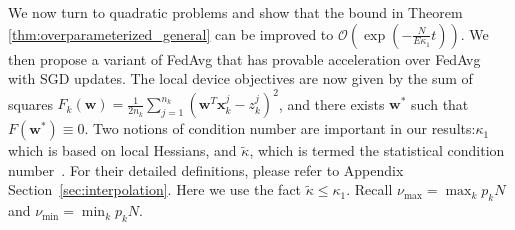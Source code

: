 We now turn to quadratic problems and show that the bound in Theorem \ref{thm:overparameterized_general} can be improved to $\mathcal{O}(\exp(-\frac{N}{E\kappa_{1}}t))$. We then propose a variant of FedAvg that has provable acceleration over FedAvg with SGD updates. The local device objectives are now given by the sum of squares {\small$F_{k}(\mathbf{w})=\frac{1}{2n_{k}}\sum_{j=1}^{n_{k}}(\mathbf{w}^{T}\mathbf{x}_{k}^{j}-z_{k}^{j})^{2}$},
and there exists $\mathbf{w}^{\ast}$ such that $F(\mathbf{w}^{\ast})\equiv0$. Two notions of condition number are important in our results:$\kappa_1$ which is based on local Hessians, and $\tilde{\kappa}$, which is termed the statistical condition number~\cite{liu2018accelerating,jain2017accelerating}. For their detailed definitions, please refer to Appendix Section~\ref{sec:interpolation}. Here we use the fact $\tilde{\kappa} \leq \kappa_1$. Recall $\nu_{\max}=\max _k p_k N$ and $\nu_{\min}=\min _k p_k N$.

\begin{comment}
Define the local Hessian matrix as $H^{k}:=\frac{1}{n_{k}}\sum_{j=1}^{n_{k}}\mathbf{x}_{k}^{j}(\mathbf{x}_{k}^{j})^{T}$, and the stochastic Hessian matrix as $\tilde{H}_{t}^{k}:=\xi_{t}^{k}(\xi_{t}^{k})^{T}$. Define $l$ to be the smallest positive number such that $\mathbb{E}\|\xi_{t}^{k}\|^{2}$$\mathbf{\xi}_{t}^{k}$($\mathbf{\xi}_{t}^{k})^{T}\preceq lH^{k}$
for all $k$. Note that $l\leq\max_{k,j}\|\mathbf{x}_{k}^{j}\|^{2}$.
Let $L$ and $\mu$ be lower and upper bounds of non-zero eigenvalues
of $H^{k}$. Define $\kappa_{1}:=l/\mu$ and $\kappa:=L/\mu$. Following
\cite{liu2018accelerating,jain2017accelerating}, we define the statistical
condition number $\tilde{\kappa}$ as the smallest positive real number
such that $\mathbb{E}\left[\langle\xi_{t}^{k}(H^{k})^{-1},\xi_{t}^{k}\rangle\xi_{t}^{k}(\xi_{t}^{k})^{T}\right] \  \preceq\tilde{\kappa}H^{k}$, for all $k$. 
The condition numbers $\kappa_{1}$ and $\tilde{\kappa}$
are important in the characterization of convergence rates for FedAvg
algorithms. Note that $\kappa_{1}>\kappa$ and $\kappa_{1}>\tilde{\kappa}$.
\end{comment}

